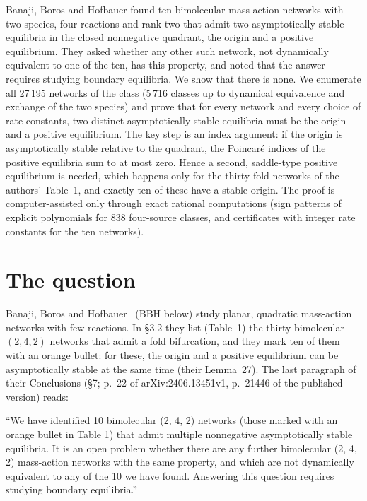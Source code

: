 \documentclass[11pt,a4paper]{report}
\begin{document}
\makepapertitle

\begin{paperabstract}
Banaji, Boros and Hofbauer found ten bimolecular mass-action networks with two species, four reactions and rank two
that admit two asymptotically stable equilibria in the closed nonnegative quadrant, the origin and a positive
equilibrium. They asked whether any other such network, not dynamically equivalent to one of the ten, has this
property, and noted that the answer requires studying boundary equilibria. We show that there is none. We
enumerate all 27\,195 networks of the class (5\,716 classes up to dynamical equivalence and exchange of the two
species) and prove that for every network and every choice of rate constants, two distinct asymptotically stable
equilibria must be the origin and a positive equilibrium. The key step is an index argument: if the origin is
asymptotically stable relative to the quadrant, the Poincar\'e indices of the positive equilibria sum to at most
zero. Hence a second, saddle-type positive equilibrium is needed, which happens only for the thirty fold networks of
the authors' Table~1, and exactly ten of these have a stable origin. The proof is computer-assisted only through exact
rational computations (sign patterns of explicit polynomials for 838 four-source classes, and certificates with
integer rate constants for the ten networks).
\end{paperabstract}

\section*{The question}

Banaji, Boros and Hofbauer~\autocite{BBH2024} (BBH below) study planar, quadratic mass-action networks with few
reactions. In §3.2 they list (Table~1) the thirty bimolecular \((2,4,2)\) networks that admit a fold bifurcation,
and they mark ten of them with an orange bullet: for these, the origin and a positive equilibrium can be
asymptotically stable at the same time (their Lemma~27). The last paragraph of their Conclusions (§7; p.~22 of
arXiv:2406.13451v1, p.~21446 of the published version) reads:

\begin{openquote}
``We have identified 10 bimolecular (2, 4, 2) networks (those marked with an orange bullet in Table 1) that admit
multiple nonnegative asymptotically stable equilibria. It is an open problem whether there are any further
bimolecular (2, 4, 2) mass-action networks with the same property, and which are not dynamically equivalent to any of
the 10 we have found. Answering this question requires studying boundary equilibria.''
\end{openquote}
\end{document}

